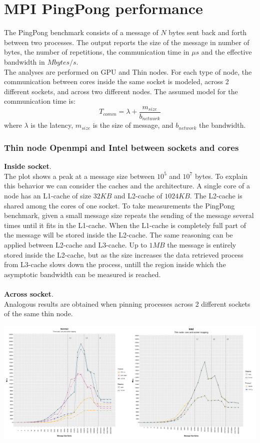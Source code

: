 \documentclass[11pt,a4paper]{report}
\theoremstyle{definition}
\begin{document}
\section{MPI PingPong performance}
The PingPong benchmark consists of a message of $N$ bytes sent back and forth between two processes. The output reports the size of the message in number of bytes, the number of repetitions, the communication time in $\mu{s}$ and the effective bandwidth in $Mbytes/s$.\\
The analyses are performed on GPU and Thin nodes. For each type of node, the communication between cores inside the same socket is modeled, across 2 different sockets, and across two different nodes. The assumed model for the communication time is:
\begin{equation*}
T_{comm} = \lambda + \dfrac{m_{size}}{b_{network}}
\end{equation*}
where $\lambda$ is the latency, $m_{size}$ is the size of message, and $b_{network}$ the bandwidth.
\subsubsection{Thin node Openmpi and Intel between sockets and cores}
\textbf{Inside socket}.\\
The plot shows a peak at a message size between $10^{5}$ and $10^{7}$ bytes. To explain this behavior we can consider the caches and the architecture. A single core of a node has an L1-cache of size $32KB$ and L2-cache of $1024KB$. The L2-cache is shared among the cores of one socket. To take measurements the PingPong benchmark, given a small message size repeats the sending of the message several times until it fits in the L1-cache. When the L1-cache is completely full part of the message will be stored inside the L2-cache. The same reasoning can be applied between L2-cache and L3-cache. Up to $1MB$ the message is entirely stored inside the L2-cache, but as the size increases the data retrieved process from L3-cache slows down the process, untill the region inside which the asymptotic bandwidth can be measured is reached.\\
\\
\textbf{Across socket}.\\
Analogous results are obtained when pinning processes across 2 different sockets of the same thin node.\\
\begin{center}
\includegraphics[scale=.25]{thin_intel_openmpi}
\end{center}
\end{document}
